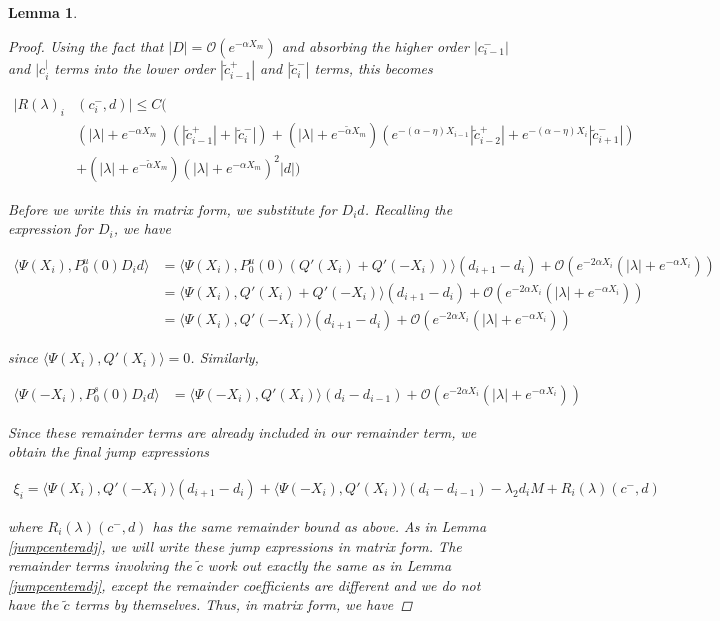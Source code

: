 \documentclass[12pt]{article}
\newtheorem{lemma}{Lemma}
\begin{document}
\begin{lemma}
\begin{proof}
Using the fact that $|D| = \mathcal{O}(e^{-\alpha X_m})$ and absorbing the higher order $|c_{i-1}^-|$ and $|c_i^|$ terms into the lower order $|\tilde{c}_{i-1}^+|$ and $|\tilde{c}_{i}^-|$ terms, this becomes

\begin{align*}
|R(\lambda)_i&(c_i^-, d)| \leq C \Big( \\
&(|\lambda| + e^{-\alpha X_m})(|\tilde{c}_{i-1}^+| + |\tilde{c}_{i}^-|) + (|\lambda| + e^{-\tilde{\alpha} X_m})( e^{-(\alpha - \eta) X_{i-1}}|\tilde{c}_{i-2}^+| + e^{-(\alpha - \eta) X_i}|\tilde{c}_{i+1}^-|) \\
&+ (|\lambda| + e^{-\tilde{\alpha} X_m})(|\lambda| + e^{-\alpha X_m})^2 |d| \Big)
\end{align*}

Before we write this in matrix form, we substitute for $D_i d$. Recalling the expression for $D_i$, we have

\begin{align*}
\langle \Psi(X_i), P_0^u(0) D_i d \rangle
&= \langle \Psi(X_i), P_0^u(0) (Q'(X_i) + Q'(-X_i)) \rangle (d_{i+1} - d_i)
+\mathcal{O}(e^{-2 \alpha X_i}(|\lambda| + e^{-\alpha X_i})) \\
&= \langle \Psi(X_i), Q'(X_i) + Q'(-X_i) \rangle (d_{i+1} - d_i)
+\mathcal{O}(e^{-2 \alpha X_i}(|\lambda| + e^{-\alpha X_i})) \\
&= \langle \Psi(X_i), Q'(-X_i) \rangle (d_{i+1} - d_i)
+\mathcal{O}(e^{-2 \alpha X_i}(|\lambda| + e^{-\alpha X_i})) 
\end{align*}

since $\langle \Psi(X_i), Q'(X_i) \rangle = 0$. Similarly, 

\begin{align*}
\langle \Psi(-X_i), P_0^s(0) D_i d \rangle
&= \langle \Psi(-X_i), Q'(X_i) \rangle (d_i - d_{i-1})
+\mathcal{O}(e^{-2 \alpha X_i}(|\lambda| + e^{-\alpha X_i})) 
\end{align*}

Since these remainder terms are already included in our remainder term, we obtain the final jump expressions

\begin{align*}
\xi_i = \langle \Psi(X_i), Q'(-X_i) \rangle (d_{i+1} - d_i)
+ \langle \Psi(-X_i), Q'(X_i) \rangle (d_i - d_{i-1})
- \lambda_2 d_i M + R_i(\lambda)(c^-, d)
\end{align*}

where $R_i(\lambda)(c^-, d)$ has the same remainder bound as above. As in Lemma \ref{jumpcenteradj}, we will write these jump expressions in matrix form. The remainder terms involving the $\tilde{c}$ work out exactly the same as in Lemma \ref{jumpcenteradj}, except the remainder coefficients are different and we do not have the $\tilde{c}$ terms by themselves. Thus, in matrix form, we have


\end{proof}
\end{lemma}
\end{document}
